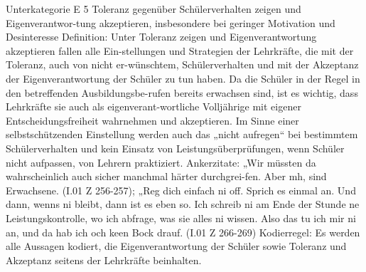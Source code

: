 Unterkategorie E 5 Toleranz gegenüber Schülerverhalten zeigen und Eigenverantwor-tung akzeptieren, insbesondere bei geringer Motivation und Desinteresse
Definition: Unter Toleranz zeigen und Eigenverantwortung akzeptieren fallen alle Ein-stellungen und Strategien der Lehrkräfte, die mit der Toleranz, auch von nicht er-wünschtem, Schülerverhalten und mit der Akzeptanz der Eigenverantwortung der Schüler zu tun haben. Da die Schüler in der Regel in den betreffenden Ausbildungsbe-rufen bereits erwachsen sind, ist es wichtig, dass Lehrkräfte sie auch als eigenverant-wortliche Volljährige mit eigener Entscheidungsfreiheit wahrnehmen und akzeptieren. Im Sinne einer selbstschützenden Einstellung werden auch das „nicht aufregen“ bei bestimmtem Schülerverhalten und kein Einsatz von Leistungsüberprüfungen, wenn Schüler nicht aufpassen, von Lehrern praktiziert. 
Ankerzitate: „Wir müssten da wahrscheinlich auch sicher manchmal härter durchgrei-fen. Aber mh, sind Erwachsene. (I.01 Z 256-257); „Reg dich einfach ni off. Sprich es einmal an. Und dann, wenns ni bleibt, dann ist es eben so. Ich schreib ni am Ende der Stunde ne Leistungskontrolle, wo ich  abfrage, was sie alles ni wissen. Also das tu ich mir ni an, und da hab ich och keen Bock drauf.  (I.01 Z 266-269)
Kodierregel: Es werden alle Aussagen kodiert, die Eigenverantwortung der Schüler sowie Toleranz und Akzeptanz seitens der Lehrkräfte beinhalten.  

